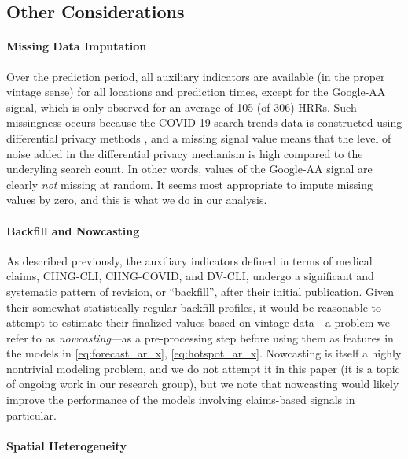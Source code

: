 \documentclass[9pt,twocolumn,twoside,lineno]{pnas-new}
\begin{document}
\subsection{Other Considerations}

\paragraph{Missing Data Imputation}

Over the prediction period, all auxiliary indicators are available (in the
proper vintage sense) for all locations and prediction times, except for the
Google-AA signal, which is only observed for an average of 105 (of 306) HRRs.
Such missingness occurs because the COVID-19 search trends data is
constructed using differential privacy methods \cite{Bavadekar:2020}, and a 
missing signal value means that the level of noise added in the differential
privacy mechanism is high compared to the underyling search count.  In other
words, values of the Google-AA signal are clearly \textit{not} missing at
random.  It seems most appropriate to impute missing values by zero, and this is
what we do in our analysis. 

\paragraph{Backfill and Nowcasting}  

As described previously, the auxiliary indicators defined in terms of medical
claims, CHNG-CLI, CHNG-COVID, and DV-CLI, undergo a significant and systematic
pattern of revision, or ``backfill'', after their initial publication.  Given
their somewhat statistically-regular backfill profiles, it would be reasonable
to attempt to estimate their finalized values based on vintage data---a problem
we refer to as \textit{nowcasting}---as a pre-processing step before using them
as features in the models in \eqref{eq:forecast_ar_x}, \eqref{eq:hotspot_ar_x}. 
Nowcasting is itself a highly nontrivial modeling problem, and we do not attempt
it in this paper (it is a topic of ongoing work in our research group), but we
note that nowcasting would likely improve the performance of the models
involving claims-based signals in particular.        

\paragraph{Spatial Heterogeneity} 
\end{document}
